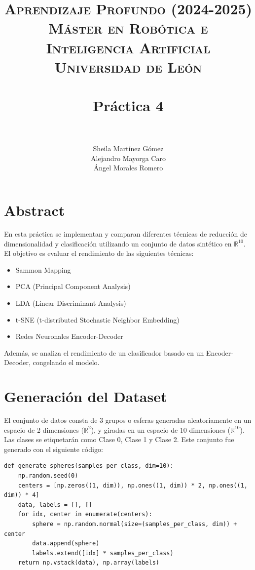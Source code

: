 \documentclass[paper=a4, fontsize=11pt]{scrartcl} %
\title{	
\normalfont \normalsize 
\textsc{{\textbf{Aprendizaje Profundo (2024-2025)}} \\ Máster en Robótica e Inteligencia Artificial \\ Universidad de León} \\ [20pt] %
\horrule{0.5pt} \\[0.4cm] %
\huge Práctica 4 \\   %
\horrule{1.5pt} \\[0.2cm] %
}
\author{Sheila Martínez Gómez\\
Alejandro Mayorga Caro\\
Ángel Morales Romero\\
}
\numberwithin{equation}{section} %
\numberwithin{figure}{section} %
\numberwithin{table}{section} %
\begin{document}
\maketitle
\newpage %

\tableofcontents %
\pagebreak
\section{Abstract}

En esta práctica se implementan y comparan diferentes técnicas de reducción de dimensionalidad y clasificación utilizando un conjunto de datos sintético en \(\mathbb{R}^{10}\). El objetivo es evaluar el rendimiento de las siguientes técnicas:

\begin{itemize}
    \item Sammon Mapping
    \item PCA (Principal Component Analysis)
    \item LDA (Linear Discriminant Analysis)
    \item t-SNE (t-distributed Stochastic Neighbor Embedding)
    \item Redes Neuronales Encoder-Decoder
\end{itemize}

Además, se analiza el rendimiento de un clasificador basado en un Encoder-Decoder, congelando el modelo.

\section{Generación del Dataset}

El conjunto de datos consta de 3 grupos o esferas generadas aleatoriamente en un espacio de 2 dimensiones (\(\mathbb{R}^{2}\)), y giradas en un espacio de 10 dimensiones (\(\mathbb{R}^{10}\)). Las clases se etiquetarán como Clase 0, Clase 1 y Clase 2. Este conjunto fue generado con el siguiente código:

\begin{verbatim}
def generate_spheres(samples_per_class, dim=10):
    np.random.seed(0)
    centers = [np.zeros((1, dim)), np.ones((1, dim)) * 2, np.ones((1, dim)) * 4]
    data, labels = [], []
    for idx, center in enumerate(centers):
        sphere = np.random.normal(size=(samples_per_class, dim)) + center
        data.append(sphere)
        labels.extend([idx] * samples_per_class)
    return np.vstack(data), np.array(labels)
\end{verbatim}
\end{document}
